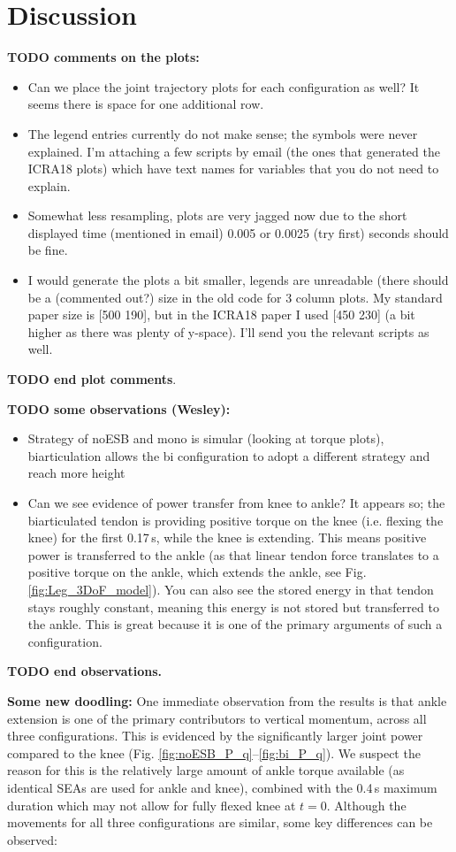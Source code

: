 \documentclass[letterpaper, 10 pt, conference]{ieeeconf}  %
\begin{document}
	\section{Discussion} \label{sec:discussion}
	\textbf{TODO comments on the plots:}
	\begin{itemize}
		\item Can we place the joint trajectory plots for each configuration as well? It seems there is space for one additional row.
		\item The legend entries currently do not make sense; the symbols were never explained. I'm attaching a few scripts by email (the ones that generated the ICRA18 plots) which have text names for variables that you do not need to explain.
		\item Somewhat less resampling, plots are very jagged now due to the short displayed time (mentioned in email) 0.005 or 0.0025 (try first) seconds should be fine.
		\item I would generate the plots a bit smaller, legends are unreadable (there should be a (commented out?) size in the old code for 3 column plots. My standard paper size is [500 190], but in the ICRA18 paper I used [450 230] (a bit higher as there was plenty of y-space). I'll send you the relevant scripts as well.
	\end{itemize}
	\textbf{TODO end plot comments}.
	
	\textbf{TODO some observations (Wesley):}
	\begin{itemize}
		\item Strategy of noESB and mono is simular (looking at torque plots), biarticulation allows the bi configuration to adopt a different strategy and reach more height
		\item Can we see evidence of power transfer from knee to ankle? It appears so; the biarticulated tendon is providing positive torque on the knee (i.e. flexing the knee) for the first 0.17\,s, while the knee is extending. This means positive power is transferred to the ankle (as that linear tendon force translates to a positive torque on the ankle, which extends the ankle, see Fig. \ref{fig:Leg_3DoF_model}). You can also see the stored energy in that tendon stays roughly constant, meaning this energy is not stored but transferred to the ankle. This is great because it is one of the primary arguments of such a configuration.
	\end{itemize}
	\textbf{TODO end observations.}
	
	\textbf{Some new doodling:}
	One immediate observation from the results is that ankle extension is one of the primary contributors to vertical momentum, across all three configurations. This is evidenced by the significantly larger joint power compared to the knee (Fig. \ref{fig:noESB_P_q}--\ref{fig:bi_P_q}). We suspect the reason for this is the relatively large amount of ankle torque available (as identical SEAs are used for ankle and knee), combined with the 0.4\,s maximum duration which may not allow for fully flexed knee at $t=0$. Although the movements for all three configurations are similar, some key differences can be observed:
	
\end{document}
